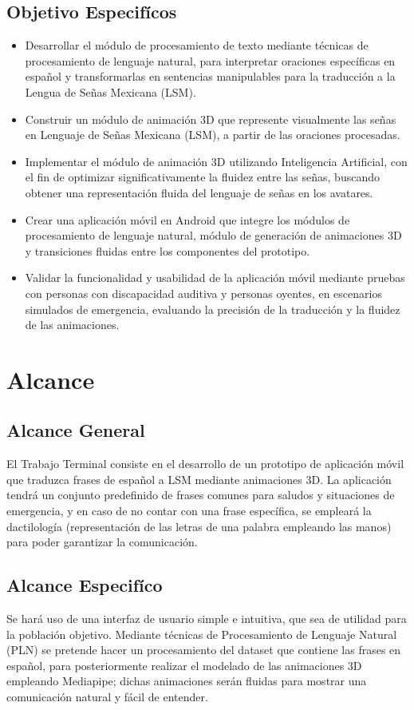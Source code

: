 \subsection{Objetivo Especifícos}
\begin{itemize}
 \item Desarrollar el módulo de procesamiento de texto mediante técnicas de procesamiento de lenguaje natural, para interpretar oraciones específicas en español y transformarlas en sentencias manipulables para la traducción a la Lengua de Señas Mexicana (LSM).
    \item Construir un módulo de animación 3D que represente visualmente las señas en Lenguaje de Señas Mexicana (LSM), a partir de las oraciones procesadas.
    \item Implementar el módulo de animación 3D utilizando Inteligencia Artificial, con el fin de optimizar significativamente la fluidez entre las señas, buscando obtener una representación fluida del lenguaje de señas en los avatares.
    \item Crear una aplicación móvil en Android que integre los módulos de procesamiento de lenguaje natural, módulo de generación de animaciones 3D y transiciones fluidas entre los componentes del prototipo.
    \item Validar la funcionalidad y usabilidad de la aplicación móvil mediante pruebas con personas con discapacidad auditiva y personas oyentes, en escenarios simulados de emergencia, evaluando la precisión de la traducción y la fluidez de las animaciones.
\end{itemize}

\section{Alcance}
\subsection{Alcance General}
El Trabajo Terminal consiste en el desarrollo de un prototipo de aplicación móvil que traduzca frases de español a LSM mediante animaciones 3D. La aplicación tendrá un conjunto predefinido de frases comunes para saludos y situaciones de emergencia, y en caso de no contar con una frase específica, se empleará la dactilología (representación de las letras de una palabra empleando las manos) para poder garantizar la comunicación.

\subsection{Alcance Especifíco}
Se hará uso de una interfaz de usuario simple e intuitiva, que sea de utilidad para la población objetivo. Mediante técnicas de Procesamiento de Lenguaje Natural (PLN) se pretende hacer un procesamiento del dataset que contiene las frases en español, para posteriormente realizar el modelado de las animaciones 3D empleando Mediapipe; dichas animaciones serán fluidas para mostrar una comunicación natural y fácil de entender.

